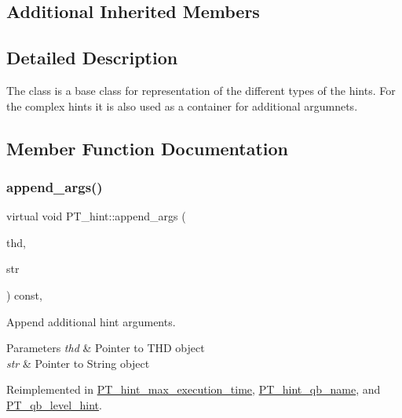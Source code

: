 \subsection*{Additional Inherited Members}


\subsection{Detailed Description}
The class is a base class for representation of the different types of the hints. For the complex hints it is also used as a container for additional argumnets. 

\subsection{Member Function Documentation}
\mbox{\label{classPT__hint_afd39b4eeed47d9b1790f12c144aece7d}} 
\subsubsection{\texorpdfstring{append\+\_\+args()}{append\_args()}}
{\footnotesize\ttfamily virtual void P\+T\+\_\+hint\+::append\+\_\+args (\begin{DoxyParamCaption}\item[{T\+HD $\ast$}]{thd,  }\item[{String $\ast$}]{str }\end{DoxyParamCaption}) const\hspace{0.3cm}{\ttfamily [inline]}, {\ttfamily [virtual]}}

Append additional hint arguments.


\begin{DoxyParams}{Parameters}
{\em thd} & Pointer to T\+HD object \\
\hline
{\em str} & Pointer to String object \\
\hline
\end{DoxyParams}


Reimplemented in \mbox{\hyperlink{classPT__hint__max__execution__time_a5062df4e31c3ddc7a6d3b17166c7cfd1}{P\+T\+\_\+hint\+\_\+max\+\_\+execution\+\_\+time}}, \mbox{\hyperlink{classPT__hint__qb__name_af186344b8fe2dcc76c187ce8dec59422}{P\+T\+\_\+hint\+\_\+qb\+\_\+name}}, and \mbox{\hyperlink{classPT__qb__level__hint_a7eb50bc395daa14498c03d9753bbf4a4}{P\+T\+\_\+qb\+\_\+level\+\_\+hint}}.

